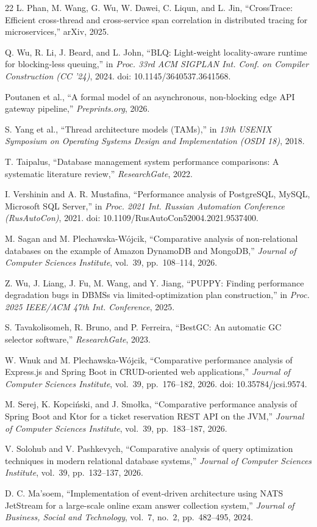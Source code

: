 \documentclass[10pt]{article}
\begin{document}
\begin{thebibliography}{22}
 L. Phan, M. Wang, G. Wu, W. Dawei, C. Liqun, and L. Jin, ``CrossTrace: Efficient cross-thread and cross-service span correlation in distributed tracing for microservices,'' arXiv, 2025.

 Q. Wu, R. Li, J. Beard, and L. John, ``BLQ: Light-weight locality-aware runtime for blocking-less queuing,'' in \emph{Proc. 33rd ACM SIGPLAN Int. Conf. on Compiler Construction (CC '24)}, 2024. doi: 10.1145/3640537.3641568.

 Poutanen et al., ``A formal model of an asynchronous, non-blocking edge API gateway pipeline,'' \emph{Preprints.org}, 2026.

 S. Yang et al., ``Thread architecture models (TAMs),'' in \emph{13th USENIX Symposium on Operating Systems Design and Implementation (OSDI 18)}, 2018.

 T. Taipalus, ``Database management system performance comparisons: A systematic literature review,'' \emph{ResearchGate}, 2022.

 I. Vershinin and A. R. Mustafina, ``Performance analysis of PostgreSQL, MySQL, Microsoft SQL Server,'' in \emph{Proc. 2021 Int. Russian Automation Conference (RusAutoCon)}, 2021. doi: 10.1109/RusAutoCon52004.2021.9537400.

 M. Sagan and M. Plechawska-Wójcik, ``Comparative analysis of non-relational databases on the example of Amazon DynamoDB and MongoDB,'' \emph{Journal of Computer Sciences Institute}, vol.~39, pp.~108--114, 2026.

 Z. Wu, J. Liang, J. Fu, M. Wang, and Y. Jiang, ``PUPPY: Finding performance degradation bugs in DBMSs via limited-optimization plan construction,'' in \emph{Proc. 2025 IEEE/ACM 47th Int. Conference}, 2025.

 S. Tavakolisomeh, R. Bruno, and P. Ferreira, ``BestGC: An automatic GC selector software,'' \emph{ResearchGate}, 2023.

 W. Wnuk and M. Plechawska-Wójcik, ``Comparative performance analysis of Express.js and Spring Boot in CRUD-oriented web applications,'' \emph{Journal of Computer Sciences Institute}, vol.~39, pp.~176--182, 2026. doi: 10.35784/jcsi.9574.

 M. Serej, K. Kopciński, and J. Smołka, ``Comparative performance analysis of Spring Boot and Ktor for a ticket reservation REST API on the JVM,'' \emph{Journal of Computer Sciences Institute}, vol.~39, pp.~183--187, 2026.

 V. Solohub and V. Pashkevych, ``Comparative analysis of query optimization techniques in modern relational database systems,'' \emph{Journal of Computer Sciences Institute}, vol.~39, pp.~132--137, 2026.

 D. C. Ma'soem, ``Implementation of event-driven architecture using NATS JetStream for a large-scale online exam answer collection system,'' \emph{Journal of Business, Social and Technology}, vol.~7, no.~2, pp.~482--495, 2024.

\end{thebibliography}
\end{document}
